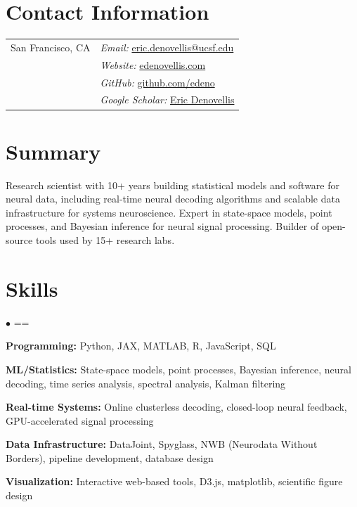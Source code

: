 \documentclass[margin,line]{res}
\makeatletter
\newenvironment{list2}{
  \begin{list}{$\bullet$}{%
      \@beginparpenalty=\@M \@itempenalty=\@M
      \setlength{\itemsep}{0in}
      \setlength{\parsep}{0in} \setlength{\parskip}{0in}
      \setlength{\topsep}{0in} \setlength{\partopsep}{0in} 
      \setlength{\leftmargin}{0.2in}}}{\end{list}}
\makeatother
\begin{document}

\begin{resume}
\section{Contact Information}
\vspace{.05in}
\begin{tabular}{@{}p{1.6in}p{4in}}
San Francisco, CA & \textit{Email:}  \href{mailto:eric.denovellis@ucsf.edu}{eric.denovellis@ucsf.edu}\\            
& \textit{Website:}  \href{https://www.edenovellis.com}{edenovellis.com}\\
& \textit{GitHub:}  \href{https://github.com/edeno}{github.com/edeno}\\
& \textit{Google Scholar:}  \href{https://scholar.google.com/citations?user=vuENbkoAAAAJ}{Eric Denovellis}
\end{tabular}

\section{Summary}
Research scientist with 10+ years building statistical models and software for neural data, including real-time neural decoding algorithms and scalable data infrastructure for systems neuroscience. Expert in state-space models, point processes, and Bayesian inference for neural signal processing. Builder of open-source tools used by 15+ research labs.

\section{Skills} 
\begin{list2}
\item \textbf{Programming:} Python, JAX, MATLAB, R, JavaScript, SQL
\item \textbf{ML/Statistics:} State-space models, point processes, Bayesian inference, neural decoding, time series analysis, spectral analysis, Kalman filtering
\item \textbf{Real-time Systems:} Online clusterless decoding, closed-loop neural feedback, GPU-accelerated signal processing
\item \textbf{Data Infrastructure:} DataJoint, Spyglass, NWB (Neurodata Without Borders), pipeline development, database design
\item \textbf{Visualization:} Interactive web-based tools, D3.js, matplotlib, scientific figure design
\end{list2}


\end{resume}
\end{document}
